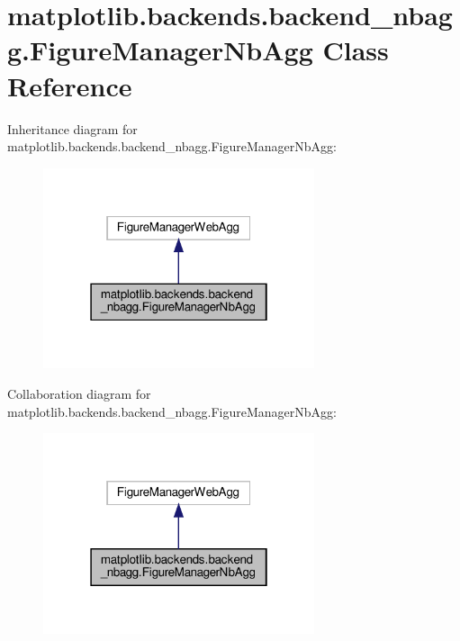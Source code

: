 \hypertarget{classmatplotlib_1_1backends_1_1backend__nbagg_1_1FigureManagerNbAgg}{}\section{matplotlib.\+backends.\+backend\+\_\+nbagg.\+Figure\+Manager\+Nb\+Agg Class Reference}
\label{classmatplotlib_1_1backends_1_1backend__nbagg_1_1FigureManagerNbAgg}


Inheritance diagram for matplotlib.\+backends.\+backend\+\_\+nbagg.\+Figure\+Manager\+Nb\+Agg\+:
\nopagebreak
\begin{figure}[H]
\begin{center}
\leavevmode
\includegraphics[width=226pt]{classmatplotlib_1_1backends_1_1backend__nbagg_1_1FigureManagerNbAgg__inherit__graph}
\end{center}
\end{figure}


Collaboration diagram for matplotlib.\+backends.\+backend\+\_\+nbagg.\+Figure\+Manager\+Nb\+Agg\+:
\nopagebreak
\begin{figure}[H]
\begin{center}
\leavevmode
\includegraphics[width=226pt]{classmatplotlib_1_1backends_1_1backend__nbagg_1_1FigureManagerNbAgg__coll__graph}
\end{center}
\end{figure}
